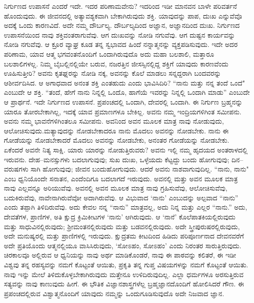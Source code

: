 ನಿರ್ಗುಣದ ಉಪಾಸನೆ ಎಂದರೆ ಇದೇ. ಇದರ ಪರಿಣಾಮವೇನು? ಇದರಿಂದ ಇಡೀ ಮಾನವನ ಬಾಳೇ ಪರಿವರ್ತನೆ ಹೊಂದುವುದು. ಈ ಜೀವನದಲ್ಲಿ ಅತ್ಯಾವಶ್ಯಕವಾಗಿ ಬೇಕಾಗಿರುವುದು ಶಕ್ತಿ. ಯಾವುದನ್ನು ಪಾಪ, ದುಃಖ ಎನ್ನುವೆವೊ ಅದಕ್ಕೆ ಒಂದು ಕಾರಣವಿದೆ. ಅದೇ ನಮ್ಮ ದೌರ್ಬಲ್ಯ. ದೌರ್ಬಲ್ಯದಿಂದ ಅಜ್ಞಾನ, ಅಜ್ಞಾನದಿಂದ ದುಃಖ. ನಿರ್ಗುಣದ ಉಪಾಸನೆಯಿಂದ ನಾವು ಶಕ್ತಿವಂತರಾಗುವೆವು. ಆಗ ದುಃಖವನ್ನು ನೋಡಿ ನಗುವೆವು. ಆಗ ದುಷ್ಟನ ಕಾರ್ಯವನ್ನು ನೋಡಿ ನಗುವೆವು. ಆ ಕ್ರೂರ ವ್ಯಾಘ್ರ ಕೂಡ ತನ್ನ ಸ್ವಭಾವದ ಹಿಂದೆ ನನ್ನಾತ್ಮನನ್ನು ವ್ಯಕ್ತಪಡಿಸುವುದು. ಇದೇ ಅದರ ಪರಿಣಾಮ, ಯಾವ ಆತ್ಮ ಭಗವಂತನೊಂದಿಗೆ ಒಂದಾಗಿರುವುದೊ ಅದು ಮಹಾ ಬಲಶಾಲಿ, ಮತ್ತಾರೂ ಬಲಶಾಲಿಗಳಲ್ಲ. ನಿಮ್ಮ ಬೈಬಲ್ಲಿನಲ್ಲಿಯೇ ಬರುವ, ನಜರತ್ತಿನ ಜೀಸಸ್ಸಿನಲ್ಲಿದ್ದ ಶಕ್ತಿಗೆ ಯಾವುದು ಕಾರಣವೆಂದು ಊಹಿಸುತ್ತೀರಿ? ಅವನು ಕೃತಘ್ನರನ್ನು ನೋಡಿ ನಕ್ಕ, ಅವನನ್ನು ಕೊಲೆ ಮಾಡಲು ಸನ್ನದ್ದರಾಗಿ ಬಂದವರನ್ನು ಆಶೀರ್ವದಿಸಿದ. ಆ ಅಗಾಧವಾದ ಅನಂತ ಶಕ್ತಿ ಎಂತಹುದು ಎಂದು ಭಾವಿಸಿದಿರಿ? “ನಾನು ಮತ್ತು ನನ್ನ ತಂದೆ ಒಂದೆ" ಎಂಬುದೇ ಆ ಶಕ್ತಿ. “ತಂದೆ, ಹೇಗೆ ನಾನು ನಿನ್ನಲ್ಲಿ ಒಂದೊ, ಹಾಗೆಯೆ ಇವರನ್ನು ನಿನ್ನಲ್ಲಿ ಒಂದಾಗಿ ಮಾಡು'' ಎಂಬುದೇ ಆ ಪ್ರಾರ್ಥನೆ. ಇದೇ ನಿರ್ಗುಣದ ಉಪಾಸನೆ. ಪ್ರಪಂಚದಲ್ಲಿ ಒಂದಾಗಿ, ದೇವರಲ್ಲಿ ಒಂದಾಗಿ. ಈ ನಿರ್ಗುಣ ಬ್ರಹ್ಮನನ್ನು ಯಾರೂ ತೋರಬೇಕಾಗಿಲ್ಲ, ಇದಕ್ಕೆ ಯಾವ ಪ್ರಮಾಣಗಳೂ ಬೇಕಿಲ್ಲ. ಅವನು ನಮ್ಮ ಇಂದ್ರಿಯಗಳಿಗಿಂತ ಸಮೀಪನು. ಅವನು ನಮ್ಮ ಭಾವನೆಗಳಿಗಿಂತಲೂ ಸಮೀಪನು. ಅವನಿಂದ ಅವನ ಮೂಲಕ ಮಾತ್ರ ನಾವು ನೋಡುವುದು, ಆಲೋಚಿಸುವುದು.\break ಮತ್ಯಾವುದನ್ನು ನೋಡಬೇಕಾದರೂ ನಾನು ಮೊದಲು ಅವನನ್ನು ನೋಡಬೇಕು. ನಾನು ಈ ಗೋಡೆಯನ್ನು ನೋಡಬೇಕಾದರೆ ಮೊದಲು ಅವನನ್ನು ನೋಡಬೇಕು, ಅನಂತರ ಗೋಡೆಯನ್ನು ನೋಡಬೇಕು. ಏಕೆಂದರೆ ಅವನೇ ನಿತ್ಯ ಸಾಕ್ಷಿ. ಯಾರು ಯಾರನ್ನು ನೋಡುತ್ತಿರುವರು? ಅವನು ಇಲ್ಲಿ ನಮ್ಮ ಹೃದಯದ ಅಂತರಾಳದಲ್ಲಿ ಇರುವನು. ದೇಹ–ಮನಸ್ಸುಗಳು ಬದಲಾಗುವುವು; ಸುಖ ದುಃಖ, ಒಳ್ಳೆಯದು ಕೆಟ್ಟದ್ದು ಬಂದು ಹೋಗುವುವು; ದಿನ–ವರುಷಗಳು ಸಾಗಿ ಹೋಗುವುವು; ಜೀವನ ಬಂದುಹೋಗುವುದು. ಆದರೆ ಅವನು ನಾಶವಾಗುವುದಿಲ್ಲ. “ನಾನು, ನಾನು" ಎಂಬ ಧ್ವನಿಯೊಂದೇ ಸನಾತನ, ಎಂದೆಂದಿಗೂ ಬದಲಾಗದೆ ಇರುವುದು. ಅವನಲ್ಲಿ ಮತ್ತು ಅವನ ಮೂಲಕ ಮಾತ್ರ ನಾವು ಎಲ್ಲವನ್ನೂ ಅರಿಯುವೆವು. ಅವನಲ್ಲಿ ಅವನ ಮೂಲಕ ಮಾತ್ರ ನಾವು ಗ್ರಹಿಸುವೆವು, ಆಲೋಚಿಸುವೆವು, ಬದುಕಿರುವೆವು, ನಾವೇನಾಗಿರುವೆವೋ ಅದಾಗಿರುವೆವು. ಆ ವಿಭುವಾದ `ನಾನು' ಎಂಬುದನ್ನು ಅಲ್ಪವಾದ “ನಾನು'' ಎಂದು ತಪ್ಪಾಗಿ ತಿಳಿದಿರುವೆವು. ಅದು ಕೇವಲ ನನ್ನ “ನಾನು” ಮಾತ್ರವಲ್ಲ, ಅದು ನಿನ್ನ ಮತ್ತು ಎಲ್ಲರ “ನಾನು.” ಅದು, ದೇವತೆಗಳ, ಪ್ರಾಣಿಗಳ, ಅತಿ ಕ್ಷುದ್ರ ಕ್ರಿಮಿಕೀಟಗಳ `ನಾನು' ಆಗಿರುವುದು. ಆ `ನಾನೆ' ಕೊಲೆಪಾತಕಿಯಲ್ಲಿರುವುದು ಮತ್ತು ಸಾಧುವಿನಲ್ಲಿರುವುದು; ಶ‍್ರೀಮಂತನಲ್ಲಿರುವುದು ಮತ್ತು ಬಡವನಲ್ಲಿರುವುದು. ಅದೇ ಸ್ತ್ರೀಪುರುಷರಲ್ಲಿರುವುದು, ಅದೇ ಮನುಷ್ಯರಲ್ಲಿ ಮತ್ತು ಪ್ರಾಣಿಗಳಲ್ಲಿ ಇರುವುದು. ಕ್ಷುದ್ರತಮ ಕೀಟದಿಂದ ಹಿಡಿದು ಪರಿಪೂರ್ಣನಾದ ದೇವನವರೆಗೆ ಅದೇ ಪ್ರತಿಯೊಂದು ಆತ್ಮನಲ್ಲಿಯೂ ವಾಸಿಸಿರುವುದು, `ಸೋಽಹಂ, ಸೋಽಹಂ' ಎಂದು ನಿರಂತರ ಸಾರುತ್ತಿರುವುದು. ಚಿರಕಾಲವೂ ಅಲ್ಲಿರುವ ಆ ಧ್ವನಿಯನ್ನು ನಾವು ಅರ್ಥ ಮಾಡಿಕೊಂಡರೆ, ನಾವು ಈ ಪಾಠವನ್ನು ಕಲಿತರೆ, ಈ ಇಡೀ ವಿಶ್ವವು ತನ್ನ ರಹಸ್ಯವನ್ನು ನಮಗೆ ಕೊಟ್ಟಂತೆ ಆಯಿತು, ಪ್ರಕೃತಿ ತನ್ನ ಗುಪ್ತ ವಿಷಯಗಳನ್ನು ನಮಗೆ ಕೊಟ್ಟಂತೆ ಆಯಿತು. ನಾವು ಇನ್ನು ಮೇಲೆ ತಿಳಿದುಕೊಳ್ಳಬೇಕಾಗಿರುವುದು ಮತ್ತೇನೂ ಉಳಿದಿರುವುದಿಲ್ಲ. ಎಲ್ಲಾ ಧರ್ಮಗಳೂ ಅರಸುತ್ತಿರುವ ಸತ್ಯವನ್ನು ನಾವು ಕಾಣುವುದು ಹೀಗೆ. ಈ ಭೌತಿಕ ವಿಜ್ಞಾನಶಾಸ್ತ್ರಗಳೆಲ್ಲ ಬ್ರಹ್ಮಜ್ಞಾನದೊಂದಿಗೆ ಹೋಲಿಸಿದರೆ ಗೌಣ. ಈ ಪ್ರಪಂಚದಲ್ಲಿರುವ ವಿಶ್ವಾತ್ಮನೊಂದಿಗೆ ಯಾವುದು ನಮ್ಮನ್ನು ಒಂದುಗೂಡಿಸುವುದೊ ಅದೇ ನಿಜವಾದ ಜ್ಞಾನ.


